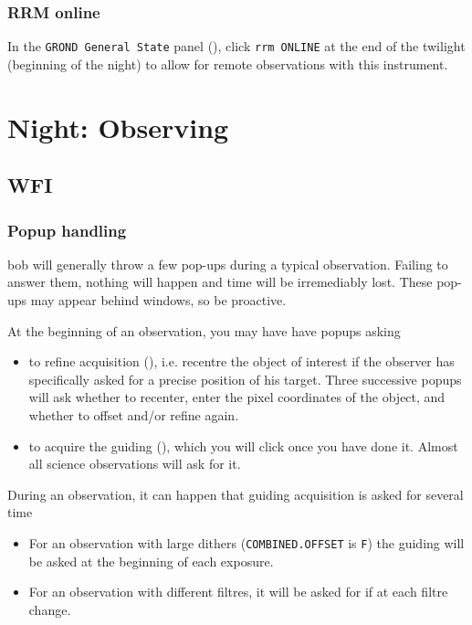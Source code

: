 \documentclass[11pt,fleqn,a4paper]{book}
\begin{document}
\subsection{RRM online}
In the \texttt{GROND \gls{General State}} panel (), click \texttt{\gls{rrm} ONLINE} at the end of the twilight (beginning of the night) to allow for remote observations with this instrument.





\chapter{Night: Observing}
\label{chap:nightops}

\section{WFI}

\subsection{Popup handling}

\gls{bob} will generally throw a few pop-ups during a typical observation. Failing  to answer them, nothing will happen and time will be irremediably lost.  These pop-ups may appear behind windows, so be proactive.

At the beginning of an observation, you may have have popups asking
\begin{itemize}
    \item to refine acquisition (), i.e. recentre the object of interest if the observer has specifically asked for a precise position of his target.  Three successive popups will ask whether to recenter, enter the pixel coordinates of the object, and whether to offset and/or refine again.
    \item to acquire the guiding (), which you will click once you have done it.  Almost all science observations will ask  for it.
\end{itemize}

During an observation, it can happen that guiding acquisition is asked for several time
\begin{itemize}
    \item For an observation with large dithers (\texttt{COMBINED.OFFSET} is \texttt{F}) the guiding will be asked at the beginning of each exposure. 
    \item For an observation with different filtres, it will be asked for if at each filtre change.
\end{itemize}
\end{document}
